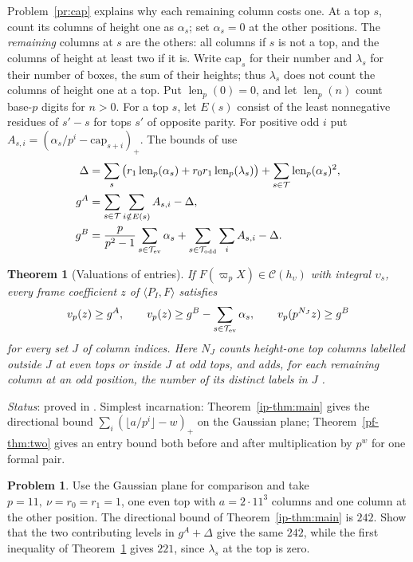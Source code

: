 \documentclass[reqno]{amsart}
\theoremstyle{definition}
\newtheorem{problem}{Problem}[section]
\theoremstyle{plain}
\newtheorem{theorem}{Theorem}[section]
\newcommand{\capn}{\mathrm{cap}}
\begin{document}
Problem~\ref{pr:cap} explains why each remaining column costs one. At a top \(s\), count its columns of height one as \(\alpha_s\); set \(\alpha_s=0\) at the other positions.  The \emph{remaining} columns at \(s\) are the others: all columns if \(s\) is not a top, and the columns of height at least two if it is.  Write \(\capn_s\) for their number and \(\lambda_s\) for their number of boxes, the sum of their heights; thus \(\lambda_s\) does not count the columns of height one at a top. Put \(\operatorname{len}_p(0)=0\), and let \(\operatorname{len}_p(n)\) count base-\(p\) digits for \(n>0\). For a top \(s\), let \(E(s)\) consist of the least nonnegative residues of \(s'-s\) for tops \(s'\) of opposite parity. For positive odd \(i\) put \(A_{s,i}=(\alpha_s/p^i-\capn_{s+i})_+\). The bounds of \cite[Thm.~9.6]{Adr} use
\begin{align*}
 \Delta&=\sum_s\big(r_1\operatorname{len}_p(\alpha_s)+r_0r_1\operatorname{len}_p(\lambda_s)\big)+\sum_{s\in\mathcal T}\operatorname{len}_p(\alpha_s)^2,\\
 g^A&=\sum_{s\in\mathcal T}\sum_{i\notin E(s)} A_{s,i}-\Delta,\\
 g^B&=\frac p{p^2-1}\sum_{s\in\mathcal T_{\rm ev}}\alpha_s
       +\sum_{s\in\mathcal T_{\rm odd}}\sum_i A_{s,i}-\Delta .
\end{align*}

\begin{theorem}[Valuations of entries]\label{thm:valuation}
If \(F(\varpi_p X)\in\mathcal C(h_\upsilon)\) with integral \(\upsilon_s\), every frame coefficient \(z\) of \(\langle P_I,F\rangle\) satisfies
\[
 v_p(z)\ge g^A,\qquad v_p(z)\ge g^B-\sum_{s\in\mathcal T_{\rm ev}}\alpha_s,
 \qquad v_p(p^{N_J}z)\ge g^B
\]
for every set \(J\) of column indices. Here \(N_J\) counts height-one top columns labelled outside \(J\) at even tops or inside \(J\) at odd tops, and adds, for each remaining column at an odd position, the number of its distinct labels in \(J\) \cite[Thm.~9.6]{Adr}.
\end{theorem}
\noindent \emph{Status}: proved in \cite{Adr}. Simplest incarnation: Theorem~\ref{ip-thm:main} gives the directional bound \(\sum_i(\lfloor a/p^i\rfloor-w)_+\) on the Gaussian plane; Theorem~\ref{pf-thm:two} gives an entry bound both before and after multiplication by \(p^w\) for one formal pair.

\begin{problem}\label{pr:digits}
Use the Gaussian plane for comparison and take \(p=11,\ \nu=r_0=r_1=1\), one even top with \(a=2\cdot11^3\) columns and one column at the other position. The directional bound of Theorem~\ref{ip-thm:main} is \(242\). Show that the two contributing levels in \(g^A+\Delta\) give the same \(242\), while the first inequality of Theorem~\ref{thm:valuation} gives \(221\), since \(\lambda_s\) at the top is zero.
\end{problem}
\end{document}

